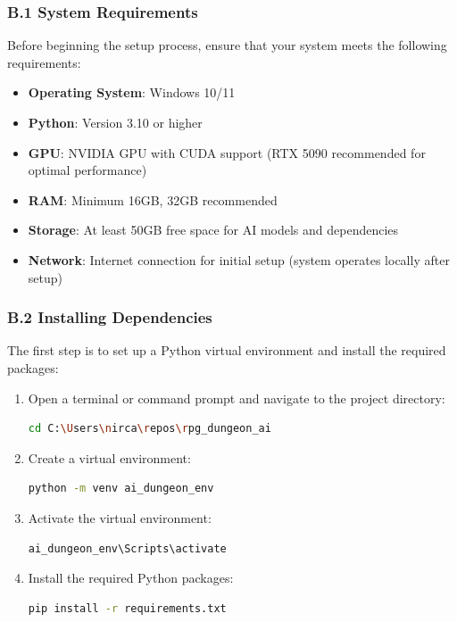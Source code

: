 \documentclass[12pt,a4paper]{article}
\begin{document}
\subsubsection*{B.1 System Requirements}

    Before beginning the setup process, ensure that your system meets the following requirements:

    \begin{itemize}
        \item \textbf{Operating System}: Windows 10/11
        \item \textbf{Python}: Version 3.10 or higher
        \item \textbf{GPU}: NVIDIA GPU with CUDA support (RTX 5090 recommended for optimal performance)
        \item \textbf{RAM}: Minimum 16GB, 32GB recommended
        \item \textbf{Storage}: At least 50GB free space for AI models and dependencies
        \item \textbf{Network}: Internet connection for initial setup (system operates locally after setup)
    \end{itemize}

\subsubsection*{B.2 Installing Dependencies}

    The first step is to set up a Python virtual environment and install the required packages:

    \begin{enumerate}
        \item Open a terminal or command prompt and navigate to the project directory:
        \begin{lstlisting}[language=bash]
cd C:\Users\nirca\repos\rpg_dungeon_ai
        \end{lstlisting}
        \item Create a virtual environment:
        \begin{lstlisting}[language=bash]
python -m venv ai_dungeon_env
        \end{lstlisting}
        \item Activate the virtual environment:
        \begin{lstlisting}[language=bash]
ai_dungeon_env\Scripts\activate
        \end{lstlisting}
        \item Install the required Python packages:
        \begin{lstlisting}[language=bash]
pip install -r requirements.txt
        \end{lstlisting}
    \end{enumerate}
\end{document}
